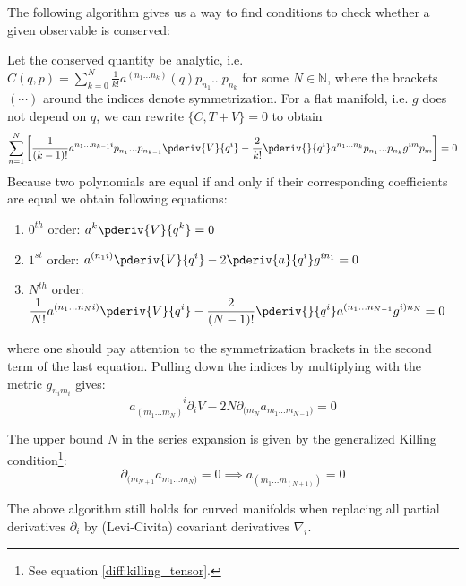 	The following algorithm gives us a way to find conditions to check whether a given observable is conserved:
	\begin{method}
		Let the conserved quantity be analytic, i.e. $C(q, p) = \sum_{k=0}^N\frac{1}{k!}a^{(n_1...n_k)}(q)p_{n_1}...p_{n_k}$ for some $N\in\mathbb{N}$, where the brackets $(\cdots)$ around the indices denote symmetrization. For a flat manifold, i.e. $g$ does not depend on $q$, we can rewrite $\{C, T+V\} = 0$ to obtain
		\[
			\sum_{n = 1}^N\left[\frac{1}{(k-1)!}a^{n_1...n_{k-1}i}p_{n_1}...p_{n_{k-1}}\pderiv{V}{q^i} - \frac{2}{k!}\pderiv{}{q^i}a^{n_1...n_k}p_{n_1}...p_{n_k}g^{im}p_m\right] = 0
		\]
		Because two polynomials are equal if and only if their corresponding coefficients are equal we obtain following equations:
		\begin{enumerate}
			\item $0^{th}$ order: $\displaystyle a^k\pderiv{V}{q^k} = 0$
			\item $1^{st}$ order: $\displaystyle a^{(n_1i)}\pderiv{V}{q^i} - 2\pderiv{a}{q^i}g^{in_1} = 0$
			\item $N^{th}$ order: $\displaystyle \frac{1}{N!}a^{(n_1...n_Ni)}\pderiv{V}{q^i} - \frac{2}{(N-1)!}\pderiv{}{q^i}a^{(n_1...n_{N-1}}g^{i)n_N} = 0$
		\end{enumerate}
		where one should pay attention to the symmetrization brackets in the second term of the last equation. Pulling down the indices by multiplying with the metric $g_{n_im_i}$ gives:
		\begin{equation}
			a_{(m_1...m_N)}^{\phantom{(m_1...m_N)}i}\partial_iV - 2N\partial_{(m_N}a_{m_1...m_{N-1})} = 0
		\end{equation}
		
		The upper bound $N$ in the series expansion is given by the generalized Killing condition\footnote{See equation \ref{diff:killing_tensor}.}:
		\begin{equation}
			\partial_{(m_{N+1}}a_{m_1...m_N)} = 0\implies a_{(m_1...m_(N+1))} = 0
		\end{equation}
	\end{method}
	\begin{remark}
		The above algorithm still holds for curved manifolds when replacing all partial derivatives $\partial_i$ by (Levi-Civita) covariant derivatives $\nabla_i$.
	\end{remark}
